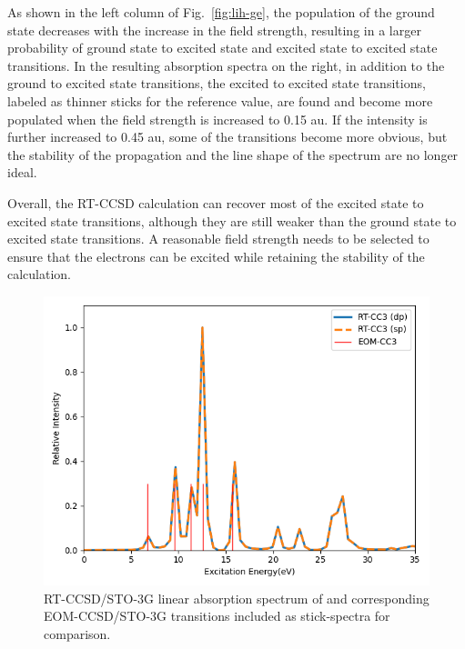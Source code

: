 As shown in the left column of Fig.~\ref{fig:lih-ge}, the population of the ground state decreases with the increase in the field strength, resulting in a larger probability of ground state to excited state and excited state to excited state transitions. In the resulting absorption spectra on the right, in addition to the ground to excited state transitions, the excited to excited state transitions, labeled as thinner sticks for the reference value, are found and become more populated when the field strength is increased to 0.15 au. If the intensity is further increased to 0.45 au, some of the transitions become more obvious, but the stability of the propagation and the line shape of the spectrum are no longer ideal.

Overall, the RT-CCSD calculation can recover most of the excited state to excited state transitions, although they are still weaker than the ground state to excited state transitions. A reasonable field strength needs to be selected to ensure that the electrons can be excited while retaining the stability of the calculation.
\begin{figure}
   \centering
   \includegraphics[angle=0, scale=0.43]{ch4/Figs/1-1.png}
   \caption{RT-CCSD/STO-3G linear absorption spectrum of  and corresponding EOM-CCSD/STO-3G transitions included as stick-spectra for comparison.}
     \label{fig:lih-abs}
\end{figure}
